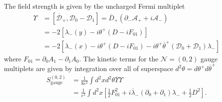 \documentclass{article}
\numberwithin{equation}{section}
\begin{document}
The field strength is given by the uncharged Fermi multiplet
\begin{align}
\label{02_fstrengh}
\Upsilon&=\left[\overline{\mathcal{D}}_{+},\mathcal{D}_{0}-\mathcal{D}_{1}\right]
=\overline{D}_{+}\left(\partial_{-}\mathcal{A}_{+}+i\mathcal{A}_{-}\right)\nonumber\\
&=-2\left[
\lambda_{-}(y)-i\theta^{+}\left(D-iF_{01}\right)
\right]\nonumber\\
&=-2\left[
\lambda_{-}(x)-i\theta^{+}\left(D-iF_{01}\right)-i\theta^{+}\overline{\theta}^{+}
\left(
\mathcal{D}_{0}+\mathcal{D}_{1}
\right)\lambda_{-}
\right]
\end{align}
where $F_{01}=\partial_{0}A_{1}-\partial_{1}A_{0}$. 
The kinetic terms for the $\mathcal{N}=(0,2)$ gauge multiplets are given 
by integration over all of superspace $d^{2}\theta=d\theta^{+}d\overline{\theta}^{+}$
\begin{align}
\label{02_gauge_A}
S_{\mathrm{gauge}}^{(0,2)}&=\frac{1}{8e^{2}}
\int d^{2}x d^{2}\theta 
\overline{\Upsilon}\Upsilon\nonumber\\
&=\frac{1}{e^{2}}
\int d^{2}x \left[
\frac12 F_{01}^{2}+i\overline{\lambda}_{-}\left(\partial_{0}+\partial_{1}\right)\lambda_{-}+\frac12 D^{2}
\right]. 
\end{align}
\end{document}
